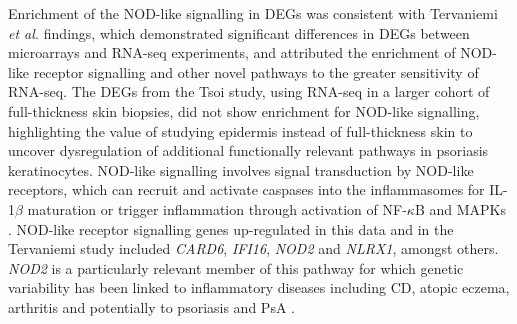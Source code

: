 Enrichment of the NOD-like signalling in DEGs was consistent with Tervaniemi \textit{et al.} findings, which demonstrated significant differences in DEGs between microarrays and RNA-seq experiments, and attributed the enrichment of NOD-like receptor signalling and other novel pathways to the greater sensitivity of RNA-seq. The DEGs from the Tsoi study, using RNA-seq in a larger cohort of full-thickness skin biopsies, did not show enrichment for NOD-like signalling, highlighting the value of studying epidermis instead of full-thickness skin to uncover dysregulation of additional functionally relevant pathways in psoriasis keratinocytes. NOD-like signalling involves signal transduction by NOD-like receptors, which can recruit and activate caspases into the inflammasomes for IL-1$\beta$ maturation or trigger inflammation through activation of NF-$\kappa$B and MAPKs  \parencite{McCormack2009}.  NOD-like receptor signalling genes up-regulated in this data and in the Tervaniemi study included \textit{CARD6}, \textit{IFI16}, \textit{NOD2} and \textit{NLRX1}, amongst others. \textit{NOD2} is a particularly relevant member of this pathway for which genetic variability has been linked to inflammatory diseases including CD, atopic eczema, arthritis and potentially to psoriasis and PsA \parencite{Zhong2013,Zhu2012}. %

